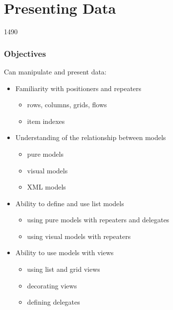 %
%
%
%

\section{Presenting Data}

\begin{slide}{1490}\frametitle{Objectives}

Can manipulate and present data:

\begin{itemize}
\item Familiarity with positioners and repeaters
  \begin{itemize}
  \item rows, columns, grids, flows
  \item item indexes
  \end{itemize}
\item Understanding of the relationship between models
  \begin{itemize}
  \item pure models
  \item visual models
  \item XML models
  \end{itemize}
\item Ability to define and use list models
  \begin{itemize}
  \item using pure models with repeaters and delegates
  \item using visual models with repeaters
  \end{itemize}
\item Ability to use models with views
  \begin{itemize}
  \item using list and grid views
  \item decorating views
  \item defining delegates
  \end{itemize}
\end{itemize}

\end{slide}


